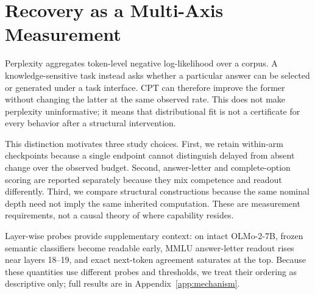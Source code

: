 \section{Recovery as a Multi-Axis Measurement}
\label{sec:observation}

Perplexity aggregates token-level negative log-likelihood over a corpus. A
knowledge-sensitive task instead asks whether a particular answer can be
selected or generated under a task interface. CPT can therefore improve the
former without changing the latter at the same observed rate. This does not make
perplexity uninformative; it means that distributional fit is not a certificate
for every behavior after a structural intervention.

This distinction motivates three study choices. First, we retain within-arm
checkpoints because a single endpoint cannot distinguish delayed from absent
change over the observed budget. Second, answer-letter and complete-option
scoring are reported separately because they mix competence and readout
differently. Third, we compare structural constructions because the same nominal
depth need not imply the same inherited computation. These are measurement
requirements, not a causal theory of where capability resides.

Layer-wise probes provide supplementary context: on intact OLMo-2-7B, frozen
semantic classifiers become readable early, MMLU answer-letter readout rises
near layers 18--19, and exact next-token agreement saturates at the top. Because
these quantities use different probes and thresholds, we treat their ordering
as descriptive only; full results are in Appendix~\ref{app:mechanism}.
